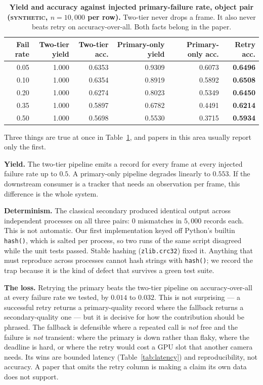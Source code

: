\documentclass[11pt,a4paper]{article}
\newcommand{\synth}{\textsc{synthetic}}
\begin{document}
\begin{table}[t]
\centering\small
\begin{tabular}{rrrrrr}
\toprule
\textbf{Fail rate} & \textbf{Two-tier yield} & \textbf{Two-tier acc.} & \textbf{Primary-only yield} & \textbf{Primary-only acc.} & \textbf{Retry acc.} \\
\midrule
0.05 & 1.000 & 0.6353 & 0.9309 & 0.6073 & \textbf{0.6496} \\
0.10 & 1.000 & 0.6354 & 0.8919 & 0.5892 & \textbf{0.6508} \\
0.20 & 1.000 & 0.6274 & 0.8023 & 0.5349 & \textbf{0.6450} \\
0.35 & 1.000 & 0.5897 & 0.6782 & 0.4491 & \textbf{0.6214} \\
0.50 & 1.000 & 0.5698 & 0.5530 & 0.3715 & \textbf{0.5934} \\
\bottomrule
\end{tabular}
\caption{\textbf{Yield and accuracy against injected primary-failure rate,
object pair (\synth, $n=10{,}000$ per row).} Two-tier never drops a frame.
It also never beats retry on accuracy-over-all. Both facts belong in the paper.}
\label{tab:yield}
\end{table}

Three things are true at once in Table~\ref{tab:yield}, and papers in this area
usually report only the first.

\textbf{Yield.} The two-tier pipeline emits a record for every frame at every
injected failure rate up to $0.5$. A primary-only pipeline degrades linearly to
$0.553$. If the downstream consumer is a tracker that needs an observation per
frame, this difference is the whole system.

\textbf{Determinism.} The classical secondary produced identical output across
independent processes on all three pairs: $0$ mismatches in $5{,}000$ records
each. This is not automatic. Our first implementation keyed off Python's builtin
\texttt{hash()}, which is salted per process, so two runs of the same script
disagreed while the unit tests passed. Stable hashing (\texttt{zlib.crc32}) fixed
it. Anything that must reproduce across processes cannot hash strings with
\texttt{hash()}; we record the trap because it is the kind of defect that survives
a green test suite.

\textbf{The loss.} Retrying the primary beats the two-tier pipeline on
accuracy-over-all at every failure rate we tested, by $0.014$ to $0.032$. This is
not surprising --- a successful retry returns a primary-quality record where the
fallback returns a secondary-quality one --- but it is decisive for how the
contribution should be phrased. The fallback is defensible where a repeated call
is \emph{not} free and the failure is \emph{not} transient: where the primary is
down rather than flaky, where the deadline is hard, or where the retry would cost
a GPU slot that another camera needs. Its wins are bounded latency
(Table~\ref{tab:latency}) and reproducibility, not accuracy. A paper that omits
the retry column is making a claim its own data does not support.
\end{document}
